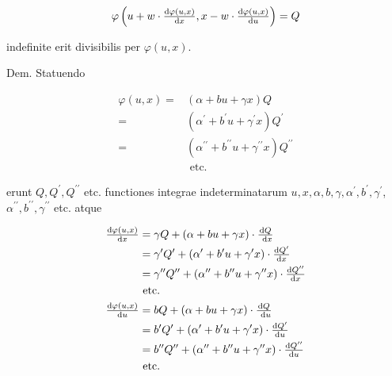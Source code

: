 \documentclass[twoside,12pt, showframe]{memoir}
\let\oldfrac\frac
\def\frac#1#2{\mathchoice{\tfrac{#1}{#2}}{\oldfrac{#1}{#2}}{\genfrac{}{}{}{2}{#1}{#2\mathstrut}}{\genfrac{}{}{}{3}{#1}{#2\mathstrut}}}
\begin{document}
\[
\varphi\left(u+w \cdot \frac{\mathrm{d} \varphi(u, x)}{\mathrm{d} x}, x-w \cdot \frac{\mathrm{d} \varphi(u, x)}{\mathrm{d} u}\right)=Q
\]

indefinite erit divisibilis per \(\varphi(u, x)\).

Dem. Statuendo

\[
\begin{aligned}
\varphi(u, x)= & (\alpha+b u+\gamma x) Q \\
= & \left(\alpha^{\prime}+b^{\prime} u+\gamma^{\prime} x\right) Q^{\prime} \\
= & \left(\alpha^{\prime \prime}+b^{\prime \prime} u+\gamma^{\prime \prime} x\right) Q^{\prime \prime} \\
& \text { etc. }
\end{aligned}
\]

erunt \(Q, Q^{\prime}, Q^{\prime \prime}\) etc. functiones integrae indeterminatarum \(u, x, \alpha, b, \gamma, \alpha^{\prime}, b^{\prime}, \gamma^{\prime}\), \(\alpha^{\prime \prime}, b^{\prime \prime}, \gamma^{\prime \prime}\) etc. atque

\[
\begin{aligned}
\frac{\mathrm{d} \varphi(u, x)}{\mathrm{d} x} & =\gamma Q+(\alpha+b u+\gamma x) \cdot \frac{\mathrm{d} Q}{\mathrm{~d} x} \\
& =\gamma^{\prime} Q^{\prime}+\left(\alpha^{\prime}+b^{\prime} u+\gamma^{\prime} x\right) \cdot \frac{\mathrm{d} Q^{\prime}}{\mathrm{d} x} \\
& =\gamma^{\prime \prime} Q^{\prime \prime}+\left(\alpha^{\prime \prime}+b^{\prime \prime} u+\gamma^{\prime \prime} x\right) \cdot \frac{\mathrm{d} Q^{\prime \prime}}{\mathrm{d} x} \\
& \text { etc. } \\
\frac{\mathrm{d} \varphi(u, x)}{\mathrm{d} u} & =b Q+(\alpha+b u+\gamma x) \cdot \frac{\mathrm{d} Q}{\mathrm{~d} u} \\
& =b^{\prime} Q^{\prime}+\left(\alpha^{\prime}+b^{\prime} u+\gamma^{\prime} x\right) \cdot \frac{\mathrm{d} Q^{\prime}}{\mathrm{d} u} \\
& =b^{\prime \prime} Q^{\prime \prime}+\left(\alpha^{\prime \prime}+b^{\prime \prime} u+\gamma^{\prime \prime} x\right) \cdot \frac{\mathrm{d} Q^{\prime \prime}}{\mathrm{d} u} \\
& \text { etc. }
\end{aligned}
\]
\end{document}
